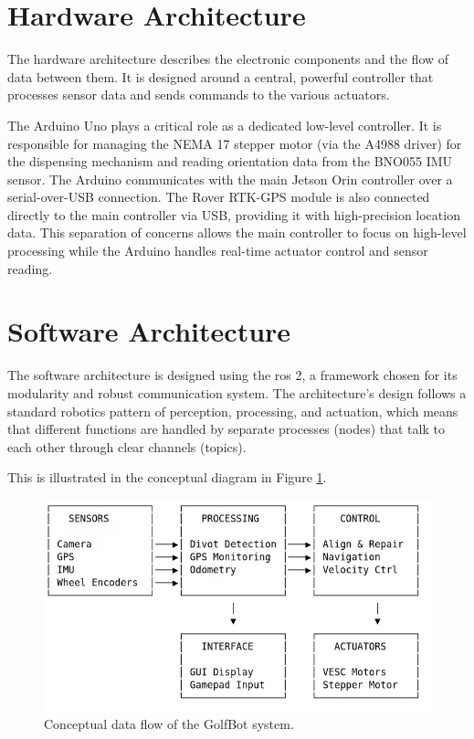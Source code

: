 \section{Hardware Architecture}
\label{sec:hardware_architecture}
The hardware architecture describes the electronic components and the flow of data between them. It is designed around a central, powerful controller that processes sensor data and sends commands to the various actuators.

The Arduino Uno plays a critical role as a dedicated low-level controller. It is responsible for managing the NEMA 17 stepper motor (via the A4988 driver) for the dispensing mechanism and reading orientation data from the BNO055 IMU sensor. The Arduino communicates with the main Jetson Orin controller over a serial-over-USB connection. The Rover RTK-GPS module is also connected directly to the main controller via USB, providing it with high-precision location data. This separation of concerns allows the main controller to focus on high-level processing while the Arduino handles real-time actuator control and sensor reading.

\section{Software Architecture}
\label{sec:software_architecture}
The software architecture is designed using the \gls{ros} 2, a framework chosen for its modularity and robust communication system. The architecture's design follows a standard robotics pattern of perception, processing, and actuation, which means that different functions are handled by separate processes (nodes) that talk to each other through clear channels (topics). 

This is illustrated in the conceptual diagram in Figure \ref{fig:conceptual_flow}.

\begin{figure}[h!]
    \centering
    \includegraphics[width=0.9\linewidth]{figures/data_flow_diagram.png}
    \caption{Conceptual data flow of the GolfBot system.}
    \label{fig:conceptual_flow}
\end{figure}

